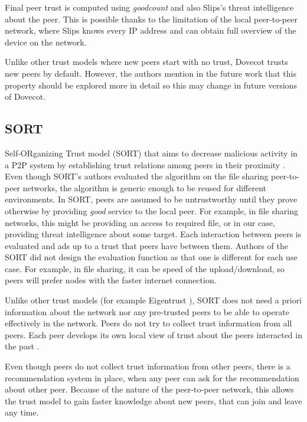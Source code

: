 Final peer trust is computed using \textit{goodcount} and also Slips's threat intelligence about the peer. 
This is possible thanks to the limitation of the local peer-to-peer network, where Slips knows every IP address and can obtain full overview of the device on the network.

Unlike other trust models where new peers start with no trust, Dovecot trusts new peers by default. 
However, the authors mention in the future work that this property should be explored more in detail so this may change in future versions of Dovecot.

\subsection{SORT}
\label{subsec:sort}
Self-ORganizing Trust model (SORT) that aims to decrease malicious activity in a P2P system by establishing trust relations among peers in their proximity \cite{sort}.
Even though SORT's authors evaluated the algorithm on the file sharing peer-to-peer networks, the algorithm is generic enough to be reused for different environments.
In SORT, peers are assumed to be untrustworthy until they prove otherwise by providing \textit{good} service to the local peer. 
For example, in file sharing networks, this might be providing an access to required file, or in our case, providing threat intelligence about some target.
Each interaction between peers is evaluated and ads up to a trust that peers have between them. 
Authors of the SORT did not design the evaluation function as that one is different for each use case. 
For example, in file sharing, it can be speed of the upload/download, so peers will prefer nodes with the faster internet connection.

Unlike other trust models (for example Eigentrust \cite{kamvar2003eigentrust}), SORT does not need a priori information about the network nor any pre-trusted peers to be able to operate effectively in the network.
Peers do not try to collect trust information from all peers.
Each peer develops its own local view of trust about the peers interacted in the past \cite{sort}.

Even though peers do not collect trust information from other peers, there is a recommendation system in place, when any peer can ask for the recommendation about other peer.
Because of the nature of the peer-to-peer network, this allows the trust model to gain faster knowledge about new peers, that can join and leave any time.

